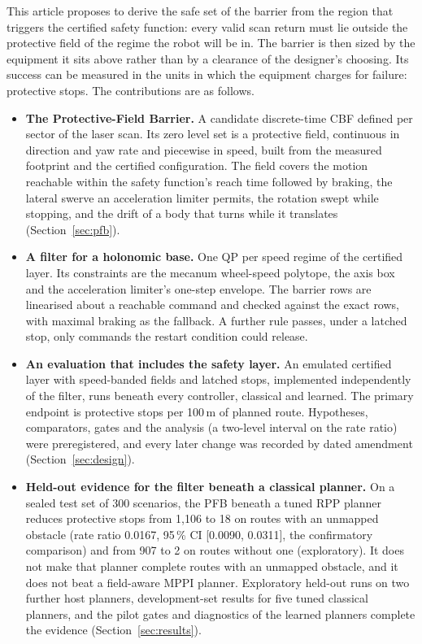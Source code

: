 \documentclass[11pt]{article}
\theoremstyle{definition}
\begin{document}
This article proposes to derive the safe set of the barrier from the region that triggers the certified safety
function: every valid scan return must lie outside the protective field of the regime the robot will be in. The barrier is then sized by the equipment it sits above rather than by a clearance of the designer's choosing. Its success can be measured in the units in which the equipment charges for failure: protective stops. The contributions are as follows.
\begin{itemize}
\item \textbf{The Protective-Field Barrier.} A candidate discrete-time CBF defined per sector of the laser scan.
Its zero level set is a protective field, continuous in direction and yaw rate and piecewise in speed, built from
the measured footprint and the certified configuration. The field covers the motion reachable within the safety
function's reach time followed by braking, the lateral swerve an acceleration limiter permits, the rotation swept
while stopping, and the drift of a body that turns while it translates (Section~\ref{sec:pfb}).
\item \textbf{A filter for a holonomic base.} One QP per speed regime of the certified layer. Its constraints are the
mecanum wheel-speed polytope, the axis box and the acceleration limiter's one-step envelope. The barrier rows are
linearised about a reachable command and checked against the exact rows, with maximal braking as the fallback. A
further rule passes, under a latched stop, only commands the restart condition could release.
\item \textbf{An evaluation that includes the safety layer.} An emulated certified layer with speed-banded fields and
latched stops, implemented independently of the filter, runs beneath every controller, classical and learned. The
primary endpoint is protective stops per 100\,m of planned route. Hypotheses, comparators, gates and the analysis (a
two-level interval on the rate ratio) were preregistered, and every later change was recorded by dated amendment
(Section~\ref{sec:design}).
\item \textbf{Held-out evidence for the filter beneath a classical planner.} On a sealed test set of 300 scenarios, the
PFB beneath a tuned RPP planner reduces protective stops from 1{,}106 to 18 on routes with an unmapped obstacle (rate
ratio 0.0167, 95\,\% CI [0.0090, 0.0311], the confirmatory comparison) and from 907 to 2 on routes without one
(exploratory). It does not make that planner complete routes with an unmapped obstacle, and it does not beat a
field-aware MPPI planner. Exploratory held-out runs on two further host planners, development-set results for five
tuned classical planners, and the pilot gates and diagnostics of the learned planners complete the evidence
(Section~\ref{sec:results}).
\end{itemize}
\end{document}
